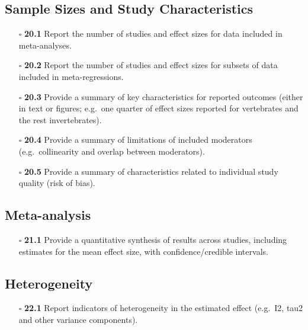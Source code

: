 \documentclass[11pt]{article}
\def\tightlist{}
\begin{document}
\begin{Form}
\subsection{Sample Sizes and Study
Characteristics}\label{sample-sizes-and-study-characteristics}

\begin{itemize}
\tightlist
\item[$\square$]
  \textbf{20.1} Report the number of studies and effect sizes for data
  included in meta-analyses.
\item[$\square$]
  \textbf{20.2} Report the number of studies and effect sizes for
  subsets of data included in meta-regressions.
\item[$\square$]
  \textbf{20.3} Provide a summary of key characteristics for reported
  outcomes (either in text or figures; e.g.~one quarter of effect sizes
  reported for vertebrates and the rest invertebrates).
\item[$\square$]
  \textbf{20.4} Provide a summary of limitations of included moderators
  (e.g.~collinearity and overlap between moderators).
\item[$\square$]
  \textbf{20.5} Provide a summary of characteristics related to
  individual study quality (risk of bias).
\end{itemize}

\subsection{Meta-analysis}\label{meta-analysis}

\begin{itemize}
\tightlist
\item[$\square$]
  \textbf{21.1} Provide a quantitative synthesis of results across
  studies, including estimates for the mean effect size, with
  confidence/credible intervals.
\end{itemize}

\subsection{Heterogeneity}\label{heterogeneity}

\begin{itemize}
\tightlist
\item[$\square$]
  \textbf{22.1} Report indicators of heterogeneity in the estimated
  effect (e.g.~I2, tau2 and other variance components).
\end{itemize}


\end{Form}
\end{document}
